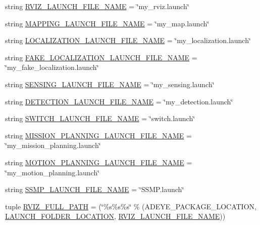 \begin{DoxyCompactItemize}
\item 
string \hyperlink{namespacemanager_af8103724e7745859a07a898ea00a8dd0}{R\+V\+I\+Z\+\_\+\+L\+A\+U\+N\+C\+H\+\_\+\+F\+I\+L\+E\+\_\+\+N\+A\+ME} = \char`\"{}my\+\_\+rviz.\+launch\char`\"{}
\item 
string \hyperlink{namespacemanager_ad33e0681d727d6ce2212b3b1e8df8c58}{M\+A\+P\+P\+I\+N\+G\+\_\+\+L\+A\+U\+N\+C\+H\+\_\+\+F\+I\+L\+E\+\_\+\+N\+A\+ME} = \char`\"{}my\+\_\+map.\+launch\char`\"{}
\item 
string \hyperlink{namespacemanager_ac5cea2f52fdf5b97671e86476298f965}{L\+O\+C\+A\+L\+I\+Z\+A\+T\+I\+O\+N\+\_\+\+L\+A\+U\+N\+C\+H\+\_\+\+F\+I\+L\+E\+\_\+\+N\+A\+ME} = \char`\"{}my\+\_\+localization.\+launch\char`\"{}
\item 
string \hyperlink{namespacemanager_a4d3eb6177218a24979c6889f9c1908d2}{F\+A\+K\+E\+\_\+\+L\+O\+C\+A\+L\+I\+Z\+A\+T\+I\+O\+N\+\_\+\+L\+A\+U\+N\+C\+H\+\_\+\+F\+I\+L\+E\+\_\+\+N\+A\+ME} = \char`\"{}my\+\_\+fake\+\_\+localization.\+launch\char`\"{}
\item 
string \hyperlink{namespacemanager_a368d806bbf5be8e72604353b971871d5}{S\+E\+N\+S\+I\+N\+G\+\_\+\+L\+A\+U\+N\+C\+H\+\_\+\+F\+I\+L\+E\+\_\+\+N\+A\+ME} = \char`\"{}my\+\_\+sensing.\+launch\char`\"{}
\item 
string \hyperlink{namespacemanager_a1312c3fc2b915604378de82f841606b3}{D\+E\+T\+E\+C\+T\+I\+O\+N\+\_\+\+L\+A\+U\+N\+C\+H\+\_\+\+F\+I\+L\+E\+\_\+\+N\+A\+ME} = \char`\"{}my\+\_\+detection.\+launch\char`\"{}
\item 
string \hyperlink{namespacemanager_ac734eeabc7266313bdf84d100e8c5d77}{S\+W\+I\+T\+C\+H\+\_\+\+L\+A\+U\+N\+C\+H\+\_\+\+F\+I\+L\+E\+\_\+\+N\+A\+ME} = \char`\"{}switch.\+launch\char`\"{}
\item 
string \hyperlink{namespacemanager_ab7fc10389616b920dfa8634166a53e72}{M\+I\+S\+S\+I\+O\+N\+\_\+\+P\+L\+A\+N\+N\+I\+N\+G\+\_\+\+L\+A\+U\+N\+C\+H\+\_\+\+F\+I\+L\+E\+\_\+\+N\+A\+ME} = \char`\"{}my\+\_\+mission\+\_\+planning.\+launch\char`\"{}
\item 
string \hyperlink{namespacemanager_a60e86ba9ca513ac1fdda1ffd0d08c900}{M\+O\+T\+I\+O\+N\+\_\+\+P\+L\+A\+N\+N\+I\+N\+G\+\_\+\+L\+A\+U\+N\+C\+H\+\_\+\+F\+I\+L\+E\+\_\+\+N\+A\+ME} = \char`\"{}my\+\_\+motion\+\_\+planning.\+launch\char`\"{}
\item 
string \hyperlink{namespacemanager_a48b997992b3e5973e9ccfe2ce7869790}{S\+S\+M\+P\+\_\+\+L\+A\+U\+N\+C\+H\+\_\+\+F\+I\+L\+E\+\_\+\+N\+A\+ME} = \char`\"{}S\+S\+M\+P.\+launch\char`\"{}
\item 
tuple \hyperlink{namespacemanager_abec52dfb99cc7cf63fc7c9c112413570}{R\+V\+I\+Z\+\_\+\+F\+U\+L\+L\+\_\+\+P\+A\+TH} = (\char`\"{}\%s\%s\%s\char`\"{} \% (A\+D\+E\+Y\+E\+\_\+\+P\+A\+C\+K\+A\+G\+E\+\_\+\+L\+O\+C\+A\+T\+I\+ON, \hyperlink{namespacemanager_aade405cb0881d91b45085d7bc0f392fa}{L\+A\+U\+N\+C\+H\+\_\+\+F\+O\+L\+D\+E\+R\+\_\+\+L\+O\+C\+A\+T\+I\+ON}, \hyperlink{namespacemanager_af8103724e7745859a07a898ea00a8dd0}{R\+V\+I\+Z\+\_\+\+L\+A\+U\+N\+C\+H\+\_\+\+F\+I\+L\+E\+\_\+\+N\+A\+ME}))

\end{DoxyCompactItemize}
